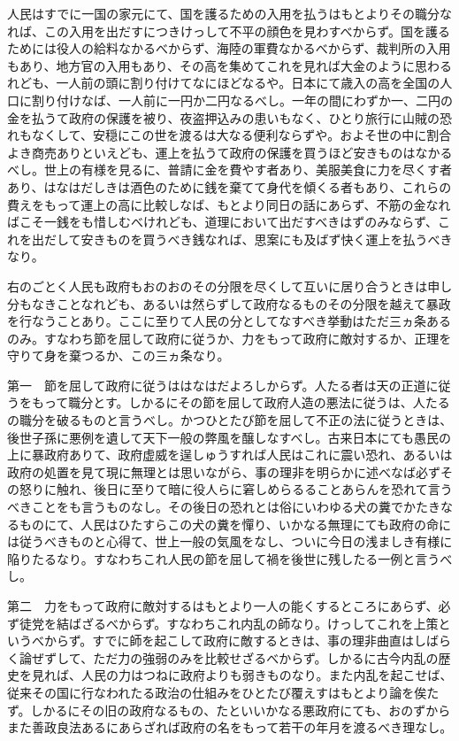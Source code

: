 \documentclass[a4paper, platex, dvipdfmx]{jsarticle}
\begin{document}
人民はすでに一国の家元にて、国を護るための入用を払うはもとよりその職分なれば、この入用を出だすにつきけっして不平の顔色を見わすべからず。国を護るためには役人の給料なかるべからず、海陸の軍費なかるべからず、裁判所の入用もあり、地方官の入用もあり、その高を集めてこれを見れば大金のように思わるれども、一人前の頭に割り付けてなにほどなるや。日本にて歳入の高を全国の人口に割り付けなば、一人前に一円か二円なるべし。一年の間にわずか一、二円の金を払うて政府の保護を被り、夜盗押込みの患いもなく、ひとり旅行に山賊の恐れもなくして、安穏にこの世を渡るは大なる便利ならずや。およそ世の中に割合よき商売ありといえども、運上を払うて政府の保護を買うほど安きものはなかるべし。世上の有様を見るに、普請に金を費やす者あり、美服美食に力を尽くす者あり、はなはだしきは酒色のために銭を棄てて身代を傾くる者もあり、これらの費えをもって運上の高に比較しなば、もとより同日の話にあらず、不筋の金なればこそ一銭をも惜しむべけれども、道理において出だすべきはずのみならず、これを出だして安きものを買うべき銭なれば、思案にも及ばず快く運上を払うべきなり。

右のごとく人民も政府もおのおのその分限を尽くして互いに居り合うときは申し分もなきことなれども、あるいは然らずして政府なるものその分限を越えて暴政を行なうことあり。ここに至りて人民の分としてなすべき挙動はただ三ヵ条あるのみ。すなわち節を屈して政府に従うか、力をもって政府に敵対するか、正理を守りて身を棄つるか、この三ヵ条なり。

第一　節を屈して政府に従うははなはだよろしからず。人たる者は天の正道に従うをもって職分とす。しかるにその節を屈して政府人造の悪法に従うは、人たるの職分を破るものと言うべし。かつひとたび節を屈して不正の法に従うときは、後世子孫に悪例を遺して天下一般の弊風を醸しなすべし。古来日本にても愚民の上に暴政府ありて、政府虚威を逞しゅうすれば人民はこれに震い恐れ、あるいは政府の処置を見て現に無理とは思いながら、事の理非を明らかに述べなば必ずその怒りに触れ、後日に至りて暗に役人らに窘しめらるることあらんを恐れて言うべきことをも言うものなし。その後日の恐れとは俗にいわゆる犬の糞でかたきなるものにて、人民はひたすらこの犬の糞を憚り、いかなる無理にても政府の命には従うべきものと心得て、世上一般の気風をなし、ついに今日の浅ましき有様に陥りたるなり。すなわちこれ人民の節を屈して禍を後世に残したる一例と言うべし。

第二　力をもって政府に敵対するはもとより一人の能くするところにあらず、必ず徒党を結ばざるべからず。すなわちこれ内乱の師なり。けっしてこれを上策というべからず。すでに師を起こして政府に敵するときは、事の理非曲直はしばらく論ぜずして、ただ力の強弱のみを比較せざるべからず。しかるに古今内乱の歴史を見れば、人民の力はつねに政府よりも弱きものなり。また内乱を起こせば、従来その国に行なわれたる政治の仕組みをひとたび覆えすはもとより論を俟たず。しかるにその旧の政府なるもの、たといいかなる悪政府にても、おのずからまた善政良法あるにあらざれば政府の名をもって若干の年月を渡るべき理なし。
\end{document}
